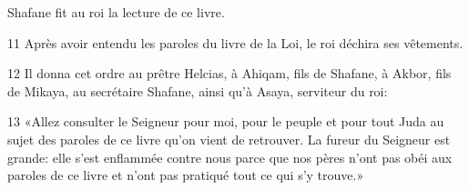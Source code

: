 Shafane fit au roi la lecture de ce livre.

11 Après avoir entendu les paroles du livre de la Loi, le roi déchira ses vêtements.

12 Il donna cet ordre au prêtre Helcias, à Ahiqam, fils de Shafane, à Akbor, fils de Mikaya, au secrétaire Shafane, ainsi qu’à Asaya, serviteur du roi:

13 «Allez consulter le Seigneur pour moi, pour le peuple et pour tout Juda au sujet des paroles de ce livre qu’on vient de retrouver. La fureur du Seigneur est grande: elle s’est enflammée contre nous parce que nos pères n’ont pas obéi aux paroles de ce livre et n’ont pas pratiqué tout ce qui s’y trouve.»